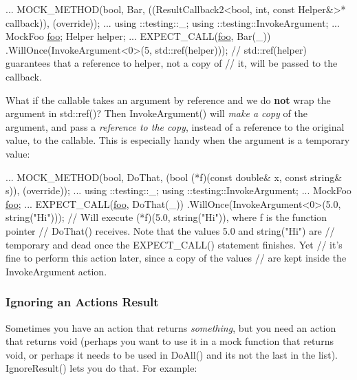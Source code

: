 \begin{DoxyCode}
...
MOCK\_METHOD(\textcolor{keywordtype}{bool}, Bar,
            ((ResultCallback2<bool, int, const Helper&>* callback)),
            (\textcolor{keyword}{override}));
...
using ::testing::\_;
using ::testing::InvokeArgument;
...
MockFoo \mbox{\hyperlink{namespacefoo}{foo}};
Helper helper;
...
EXPECT\_CALL(\mbox{\hyperlink{namespacefoo}{foo}}, Bar(\_))
    .WillOnce(InvokeArgument<0>(5, std::ref(helper)));
    \textcolor{comment}{// std::ref(helper) guarantees that a reference to helper, not a copy of}
    \textcolor{comment}{// it, will be passed to the callback.}
\end{DoxyCode}


What if the callable takes an argument by reference and we do {\bfseries not} wrap the argument in {\ttfamily std\+::ref()}? Then {\ttfamily Invoke\+Argument()} will {\itshape make a copy} of the argument, and pass a {\itshape reference to the copy}, instead of a reference to the original value, to the callable. This is especially handy when the argument is a temporary value\+:


\begin{DoxyCode}
...
MOCK\_METHOD(\textcolor{keywordtype}{bool}, DoThat, (\textcolor{keywordtype}{bool} (*f)(\textcolor{keyword}{const} \textcolor{keywordtype}{double}& x, \textcolor{keyword}{const} \textcolor{keywordtype}{string}& s)),
            (\textcolor{keyword}{override}));
...
using ::testing::\_;
using ::testing::InvokeArgument;
...
MockFoo \mbox{\hyperlink{namespacefoo}{foo}};
...
EXPECT\_CALL(\mbox{\hyperlink{namespacefoo}{foo}}, DoThat(\_))
    .WillOnce(InvokeArgument<0>(5.0, \textcolor{keywordtype}{string}(\textcolor{stringliteral}{"Hi"})));
    \textcolor{comment}{// Will execute (*f)(5.0, string("Hi")), where f is the function pointer}
    \textcolor{comment}{// DoThat() receives.  Note that the values 5.0 and string("Hi") are}
    \textcolor{comment}{// temporary and dead once the EXPECT\_CALL() statement finishes.  Yet}
    \textcolor{comment}{// it's fine to perform this action later, since a copy of the values}
    \textcolor{comment}{// are kept inside the InvokeArgument action.}
\end{DoxyCode}


\subsubsection*{Ignoring an Action\textquotesingle{}s Result}

Sometimes you have an action that returns {\itshape something}, but you need an action that returns {\ttfamily void} (perhaps you want to use it in a mock function that returns {\ttfamily void}, or perhaps it needs to be used in {\ttfamily Do\+All()} and it\textquotesingle{}s not the last in the list). {\ttfamily Ignore\+Result()} lets you do that. For example\+:


